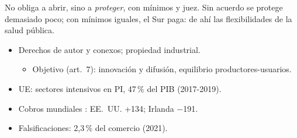 \documentclass{article}
\begin{document}
\begin{columnas}
\begin{ideaclave}
No obliga a abrir, sino a \emph{proteger}, con mínimos y juez. Sin acuerdo se protege demasiado poco; con mínimos iguales, el Sur paga: de ahí las flexibilidades de la salud pública.
\end{ideaclave}

\begin{itemize}
\item Derechos de autor y conexos; propiedad industrial.
  \begin{itemize}
  \item Objetivo (art.~7): innovación y difusión, equilibrio productores-usuarios.
  \end{itemize}
\item UE: sectores intensivos en PI, 47\,\% del PIB (2017-2019).
\item Cobros mundiales : EE.~UU. +134; Irlanda $-$191.
\item Falsificaciones: 2,3\,\% del comercio (2021).
\end{itemize}


\end{columnas}
\end{document}
